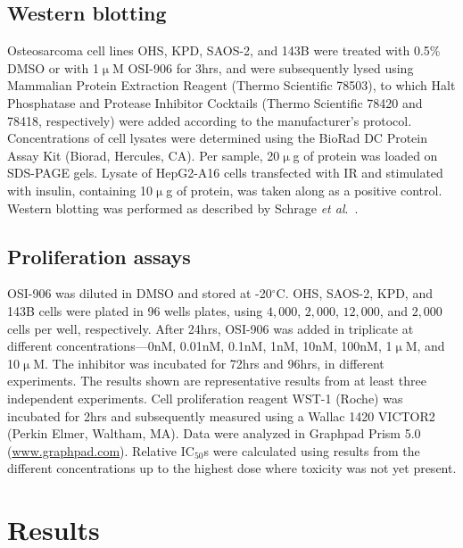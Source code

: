 \subsection{Western blotting}
Osteosarcoma cell lines OHS, KPD, SAOS-2, and 143B were treated with 0.5\% DMSO or with 1$\upmu$M OSI-906 for 3hrs, and were subsequently lysed using Mammalian Protein Extraction Reagent (Thermo Scientific 78503), to which Halt Phosphatase and Protease Inhibitor Cocktails (Thermo Scientific 78420 and 78418, respectively) were added according to the manufacturer's protocol. Concentrations of cell lysates were determined using the BioRad DC Protein Assay Kit (Biorad, Hercules, CA). Per sample, 20$\upmu$g of protein was loaded on SDS-PAGE gels. Lysate of HepG2-A16 cells transfected with IR and stimulated with insulin, containing 10$\upmu$g of protein, was taken along as a positive control. Western blotting was performed as described by Schrage {\it et al}.~\cite{schrage2009kinome}.

\subsection{Proliferation assays}
OSI-906 was diluted in DMSO and stored at -20$^\circ$C. OHS, SAOS-2, KPD, and 143B cells were plated in 96 wells plates, using $4,000$, $2,000$, $12,000$, and $2,000$ cells per well, respectively. After 24hrs, OSI-906 was added in triplicate at different concentrations---0nM, 0.01nM, 0.1nM, 1nM, 10nM, 100nM, 1$\upmu$M, and 10$\upmu$M. The inhibitor was incubated for 72hrs and 96hrs, in different experiments. The results shown are representative results from at least three independent experiments. Cell proliferation reagent WST-1 (Roche) was incubated for 2hrs and subsequently measured using a Wallac 1420 VICTOR2 (Perkin Elmer, Waltham, MA). Data were analyzed in Graphpad Prism 5.0 (\url{www.graphpad.com}). Relative IC$_{50}$s were calculated using results from the different concentrations up to the highest dose where toxicity was not yet present.

\section{Results}\label{results5}
